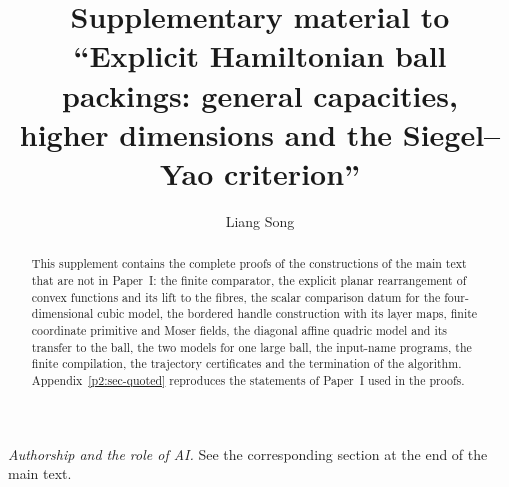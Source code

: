 \documentclass[11pt]{amsart}
\title[Supplement: explicit Hamiltonian ball packings]{Supplementary material to\\
``Explicit Hamiltonian ball packings: general capacities,\\ higher dimensions and the Siegel--Yao criterion''}
\author{Liang Song}
\date{}
\begin{document}
\begin{abstract}
This supplement contains the complete proofs of the constructions of the main text that are not in Paper~I: the
finite comparator, the explicit planar rearrangement of convex functions and its lift to the fibres, the scalar
comparison datum for the four-dimensional cubic model, the bordered handle construction with its layer maps, finite
coordinate primitive and Moser fields, the diagonal affine quadric model and its transfer to the ball, the two models
for one large ball, the input-name programs, the finite compilation, the trajectory certificates and the termination
of the algorithm. Appendix~\ref{p2:sec-quoted} reproduces the statements of Paper~I used in the proofs.
\end{abstract}
\maketitle

\noindent\emph{Authorship and the role of AI.} See the corresponding section at the end of the main text.

\setcounter{tocdepth}{1}
\tableofcontents



















\appendix




\end{document}
